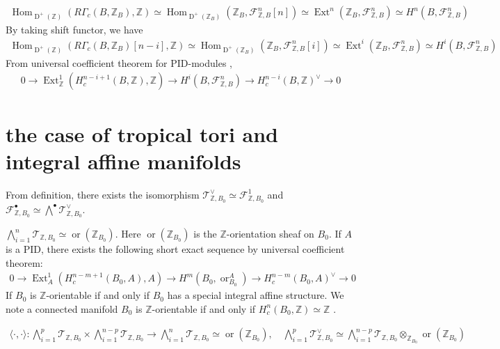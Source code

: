 \documentclass[a4paper,dvipdfmx,reqno,12pt]{amsart}
\theoremstyle{definition}
\newcommand{\Z}{\mathbb{Z}}%
\newcommand{\mcal}[1]{\mathcal{#1}}%
\newcommand{\opn}[1]{\operatorname{#1}}
\newcommand{\abk}[1]{\langle {#1} \rangle}%
\newcommand{\TBZ}{\mcal{T}_{\Z,B_0}}
\newcommand{\FBZ}{\mcal{F}_{\Z,B}}
\numberwithin{equation}{section}
\begin{document}
\begin{align}
  \opn{Hom}_{\opn{D}^{+}(\Z)}(R\Gamma_c(B,\Z_B),\Z)\simeq \opn{Hom}_{\opn{D}^{+}(\Z_{B})}(\Z_B, \FBZ^{n}[n] )\simeq \opn{Ext}^{n}(\Z_{B},\FBZ^{n})\simeq H^{n}(B,\FBZ^{n})
\end{align}
By taking shift functor, we have
\begin{align}
  \opn{Hom}_{\opn{D}^{+}(\Z)}(R\Gamma_c(B,\Z_B)[n-i],\Z)\simeq \opn{Hom}_{\opn{D}^{+}(\Z_{B})}(\Z_B, \FBZ^{n}[i] )\simeq \opn{Ext}^{i}(\Z_{B},\FBZ^{n})\simeq H^{i}(B,\FBZ^{n})
\end{align}
From universal coefficient theorem for PID-modules \cite[3.6.5]{MR1269324},
\begin{align}
  0 \to \opn{Ext}^{1}_{\Z}(H^{n-i+1}_c(B,\Z),\Z)\to H^{i}(B,\FBZ^{n}) \to H^{n-i}_c(B,\Z)^{\vee}\to 0
\end{align}



\section{the case of tropical tori and integral affine manifolds}



From definition, there exists the isomorphism $\TBZ^{\vee}\simeq \mcal{F}_{\Z,B_0}^{1}$ and $\mcal{F}_{\Z,B_0}^{\bullet}\simeq \bigwedge^{\bullet}\TBZ^{\vee}$.

$\bigwedge^{n}_{i=1}\TBZ\simeq \opn{or}(\Z_{B_0})$. Here $\opn{or}(\Z_{B_0})$ is the $\Z$-orientation sheaf on $B_0$.
If $A$ is a PID, there exists the following short exact sequence  by universal coefficient theorem:
\begin{align}
  0\to \opn{Ext}^{1}_{A}(H^{n-m+1}_c(B_0,A),A) \to H^{m}(B_0,\opn{or}^{A}_{B_0})\to H^{n-m}_c(B_0,A)^{\vee}\to 0
\end{align}
If
$B_0$ is $\Z$-orientable if and only if $B_0$ has a special integral affine structure. We note a connected manifold $B_0$ is $\Z$-orientable if and only if $H^{n}_c(B_0,\Z)\simeq \Z$
\cite[VI Theorem 6.4]{iversenCohomologySheaves1986a}.

\begin{align}
  \abk{\cdot,\cdot}: \bigwedge_{i=1}^{p} \TBZ\times  \bigwedge_{i=1}^{n-p} \TBZ \to \bigwedge_{i=1}^{n} \TBZ \simeq \opn{or}(\Z_{B_0}),\quad \bigwedge_{i=1}^{p}\TBZ^{\vee}\simeq \bigwedge_{i=1}^{n-p}\TBZ\otimes_{\Z_{B_0}}\opn{or}(\Z_{B_0})
\end{align}
\end{document}
